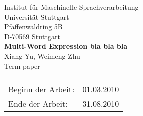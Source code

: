 \documentclass[12pt,leqno,a4paper]{article}
\newcommand{\Titel}{Multi-Word Expression bla bla bla}
\begin{document}
\begin{titlepage}
  \large
  \begin{center}
    Institut f\"ur Maschinelle Sprachverarbeitung\\
    Universit\"at Stuttgart\\
    Pfaffenwaldring 5B\\
    D-70569 Stuttgart\\    
      \vfill
    {\LARGE \bf \Titel} \\
    \vspace{2cm}
    Xiang Yu, Weimeng Zhu\\
    Term paper 
      \vfill
    \begin{tabular}[t]{lr}
    \\
    \\
    {Beginn der Arbeit:} & 01.03.2010\\
    {Ende der Arbeit:} & 31.08.2010\\
    \end{tabular}
  \end{center}

  \normalsize
\end{titlepage}

\newpage
\thispagestyle{empty}










\tableofcontents
\newpage














%






\end{document}
